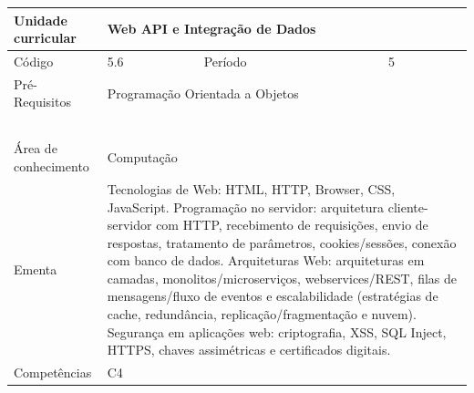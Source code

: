 \clearpage
\newpage

\begin{quadro}[ht!]
  \centering\scriptsize
\caption{Unidade Curricular Web API e Integração de Dados}

\begin{tabular}{|p{2.5cm}|p{2.5cm}|p{2.5cm}|p{2.5cm}|p{2.5cm}|}\hline

  Unidade curricular & \multicolumn{4}{p{10cm}|}{ Web API e Integração de Dados }\\\hline
  Código & 5.6 & Período & \multicolumn{2}{p{5cm}|}{ 5 }\\\hline
  Pré-Requisitos & \multicolumn{4}{p{10cm}|}{ Programação Orientada a Objetos } \\\hline
  \cellcolor{blue1}{ CH PRESENCIAL } &
    \cellcolor{blue1}{CH EAD Síncrona} &
    \cellcolor{blue1}{CH EAD Síncrona Mediada} &
    \cellcolor{blue1}{CH EAD Assíncrona} &
    \cellcolor{blue1}{CH APCC} \\\hline
  \cellcolor{blue1}{ 30 } &
    \cellcolor{blue1}{ 0 } &
    \cellcolor{blue1}{ 0 } &
    \cellcolor{blue1}{ 30 } &
    \cellcolor{blue1}{0} \\\hline
  \cellcolor{blue1}{ CH Teórica } &
    \cellcolor{blue1}{CH Prática} &
    \cellcolor{blue1}{CH Humanidades} &
    \cellcolor{blue1}{CH Extensão} &
    \cellcolor{blue1}{CH EAD TOTAL} \\\hline
  \cellcolor{blue1}{ 30 } &
    \cellcolor{blue1}{ 30 } &
    \cellcolor{blue1}{ 0 } &
    \cellcolor{blue1}{ 0 } &
    \cellcolor{blue1}{ 30 } \\\hline
  \cellcolor{blue1}{CARGA-HORÁRIA TOTAL} & \multicolumn{4}{p{10cm}|}{ \cellcolor{blue1}{ 60 } } \\\hline
  Área de conhecimento & \multicolumn{4}{p{10cm}|}{ Computação } \\\hline
  Ementa & \multicolumn{4}{p{10cm}|}{ Tecnologias de Web: HTML, HTTP, Browser, CSS, JavaScript. Programação no servidor: arquitetura cliente-servidor com HTTP, recebimento de requisições, envio de respostas, tratamento de parâmetros, cookies/sessões, conexão com banco de dados. Arquiteturas Web: arquiteturas em camadas, monolitos/microserviços, webservices/REST, filas de mensagens/fluxo de eventos e escalabilidade (estratégias de cache, redundância, replicação/fragmentação e nuvem). Segurança em aplicações web: criptografia, XSS, SQL Inject, HTTPS, chaves assimétricas e certificados digitais. } \\\hline
  Competências & \multicolumn{4}{p{10cm}|}{ C4 } \\\hline


  
	\end{tabular}

\end{quadro}


